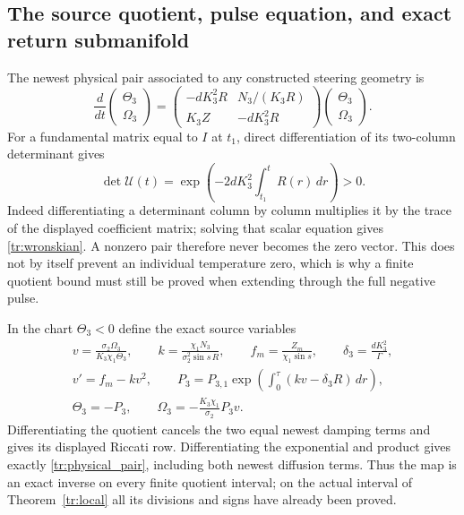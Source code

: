 \subsection{The source quotient, pulse equation, and exact return submanifold}

The newest physical pair associated to any constructed steering
geometry is
\begin{equation}\label{tr:physical_pair}
 \frac d{dt}\begin{pmatrix}\Theta_3\\\Omega_3\end{pmatrix}
 =\begin{pmatrix}
 -dK_3^2R&N_3/(K_3R)\\
 K_3Z&-dK_3^2R
 \end{pmatrix}
 \begin{pmatrix}\Theta_3\\\Omega_3\end{pmatrix}.
\end{equation}
For a fundamental matrix equal to $I$ at $t_1$, direct
differentiation of its two-column determinant gives
\begin{equation}\label{tr:wronskian}
 \det\mathcal U(t)=
 \exp\left(-2dK_3^2\int_{t_1}^tR(r)\,dr\right)>0.
\end{equation}
Indeed differentiating a determinant column by column multiplies it
by the trace of the displayed coefficient matrix; solving that scalar
equation gives \eqref{tr:wronskian}. A nonzero pair therefore never
becomes the zero vector. This does not by itself prevent an individual
temperature zero, which is why a finite quotient bound must still be
proved when extending through the full negative pulse.

In the chart $\Theta_3<0$ define the exact source variables
\begin{equation}\label{tr:quotient}
 \begin{gathered}
 v=\frac{\sigma_2\Omega_3}{K_3\chi_1\Theta_3},\qquad
 k=\frac{\chi_1N_3}{\sigma_2^2\sin s\,R},\qquad
 f_m=\frac{Z_m}{\chi_1\sin s},\qquad
 \delta_3=\frac{dK_3^2}{\Gamma},\\
 v'=f_m-kv^2,\qquad
 P_3=P_{3,1}\exp\left(\int_0^\tau(kv-\delta_3R)\,dr\right),\\
 \Theta_3=-P_3,\qquad
 \Omega_3=-\frac{K_3\chi_1}{\sigma_2}P_3v.
 \end{gathered}
\end{equation}
Differentiating the quotient cancels the two equal newest damping
terms and gives its displayed Riccati row. Differentiating the
exponential and product gives exactly \eqref{tr:physical_pair},
including both newest diffusion terms. Thus the map is an exact
inverse on every finite quotient interval; on the actual interval
of Theorem~\ref{tr:local} all its divisions and signs have already
been proved.

